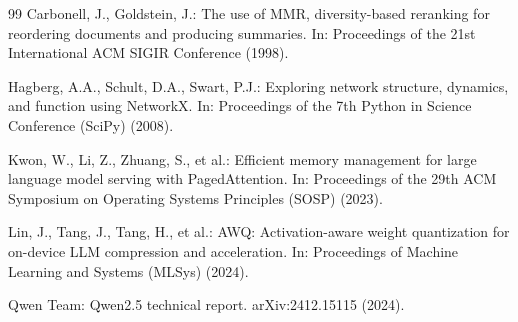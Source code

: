 \begin{thebibliography}{99}
Carbonell, J., Goldstein, J.: The use of MMR, diversity-based reranking for reordering documents and producing
summaries. In: Proceedings of the 21st International ACM SIGIR Conference (1998).

Hagberg, A.A., Schult, D.A., Swart, P.J.: Exploring network structure, dynamics, and function using NetworkX. In:
Proceedings of the 7th Python in Science Conference (SciPy) (2008).

Kwon, W., Li, Z., Zhuang, S., et al.: Efficient memory management for large language model serving with
PagedAttention. In: Proceedings of the 29th ACM Symposium on Operating Systems Principles (SOSP) (2023).

Lin, J., Tang, J., Tang, H., et al.: AWQ: Activation-aware weight quantization for on-device LLM compression and
acceleration. In: Proceedings of Machine Learning and Systems (MLSys) (2024).

Qwen Team: Qwen2.5 technical report. arXiv:2412.15115 (2024).

\end{thebibliography}
